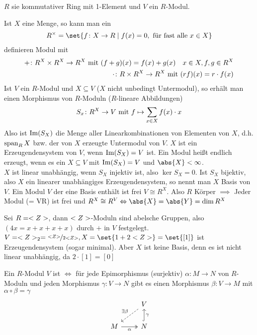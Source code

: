 $R$ sie kommutativer Ring mit 1-Element und $V$ ein $R$-Modul.
\begin{erinnerung}
	Ist $X$ eine Menge, so kann man ein
	\begin{align*}
		R^{\times} = \set{f\colon X \to R \mid f(x) = 0, \text{ für fast alle }x \in X}
	\end{align*}
	definieren Modul mit
	\begin{align*}
		+ \colon R^X \times R^X \to R^X \mit (f+g)(x) = f(x)+g(x)\quad x \in X, f,g \in R^X\\
		\cdot\colon R \times R^X \to R^X \mit (rf)(x) = r\cdot f(x)
	\end{align*}
	Ist $V$ ein $R$-Modul und $X \subseteq V$ ($X$ nicht unbedingt Untermodul), so erhält man einen Morphismus von $R$-Moduln ($R$-lineare Abbildungen)
	\begin{align*}
		S_x\colon R^X \to V \mit f \mapsto \sum_{x\in X}f(x)\cdot x
	\end{align*}
	Also ist $\Image(S_X)$ die Menge aller Linearkombinationen von Elementen von $X$, d.h. $\Span_R X$ bzw. der von $X$ erzeugte Untermodul von $V$. $X$ ist ein Erzeugendensystem von $V$, wenn $\Image(S_X) = V$ ist. Ein Modul heißt endlich erzeugt, wenn es ein $X \subseteq V$ mit $\Image(S_X) = V$ und $\abs{X} < \infty$.\\
	$X$ ist linear unabhängig, wenn $S_X$ injektiv ist, also $\ker S_X = 0$. Ist $S_X$ bijektiv, also $X$ ein linearer unabhängiges Erzeugendensystem, so nennt man $X$ Basis von $V$. Ein Modul $V$ der eine Basis enthält ist frei $V \cong R^X$. Also $R$ Körper $\implies$ Jeder Modul (= VR) ist frei und $R^X \cong R^V \Leftrightarrow \abs{X} = \abs{Y} = \dim R^X$
\end{erinnerung}
\begin{example}
	Sei $R = \Z$, dann $\Z$-Moduln sind abelsche Gruppen, also $(4x = x+x+x+x)$ durch $+$ in $V$ festgelegt. $V = \Z_2 = \lnkset{\Z}{2 \Z}, X = \set{1 + 2\Z} = \set{[1]}$ ist Erzeugendensystem (sogar minimal). Aber $X$ ist keine Basis, denn es ist nicht linear unabhängig, da $2 \cdot [1] = [0]$
\end{example}
\begin{definition}
	Ein $R$-Modul $V$ ist  $\Leftrightarrow$ für jede Epimorphismus (surjektiv) $\alpha \colon M \to N$ von $R$-Moduln und jeden Morphismus $\gamma \colon V \to N$ gibt es einen Morphismus $\beta \colon V \to M$ mit $\alpha \circ \beta = \gamma$
	\[
		\begin{tikzcd}
		& V \arrow[ld, "\exists \beta"', dashed] \\
		M \arrow[r, "\alpha"', two heads] & N \arrow[u, "\gamma"', hook]          
		\end{tikzcd}
	\]
\end{definition}
